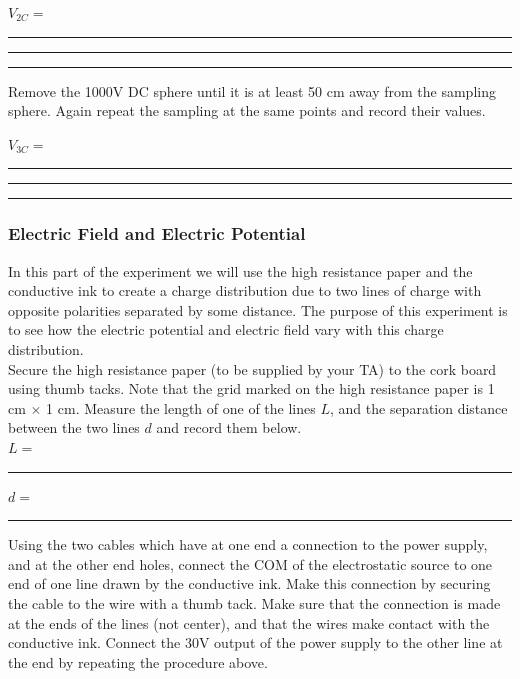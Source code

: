 {{\vspace{1cm}
  \hspace{2cm}$V_{2C}=$\rule{2.5cm}{.1mm}\hspace{1cm}\rule{2.5cm}{.1mm}\hspace{1cm}\rule{2.5cm}{.1mm}

\vspace{1cm}

\noindent Remove the 1000V DC sphere until it is at least 50 cm
away from the sampling sphere.  Again repeat the sampling at the
same points and record their values.

\vspace{3cm}
  
\hspace{2cm}$V_{3C}=$\rule{2.5cm}{.1mm}\hspace{1cm}\rule{2.5cm}{.1mm}\hspace{1cm}\rule{2.5cm}{.1mm}

\vspace{1cm}

\subsubsection{Electric Field and Electric Potential}
In this part of the experiment we will use the high resistance
paper and the conductive ink to create a charge distribution due
to two lines of charge with opposite polarities separated by
some distance. The purpose of this experiment is to see how the
electric potential and electric field vary with
this charge distribution.\\
Secure the high resistance paper (to be
supplied by your TA) to the cork board using thumb tacks. 
Note that the grid marked on the high resistance paper
is 1 cm $\times$ 1 cm. Measure the length of one of the lines 
$L$, and the separation distance between the two lines $d$ and 
record them below.\\

\vspace{1cm}
\hspace{3cm}$L=$\rule{2cm}{.1mm}\hspace{1cm}$d=$\rule{2cm}{.1mm}
\vspace{1cm}

\noindent Using the two cables which have at one end a connection
to the power supply, and at the other end holes, connect the COM of
the electrostatic source to one end of one line drawn by the
conductive ink.  Make this connection by securing the cable to the
wire with a thumb tack.  Make sure that the connection is made at
the ends of the lines (not center), and that the wires make
contact with the conductive ink. Connect the 30V output of the
power supply to the other line at the end by repeating the procedure above.\\

}}
